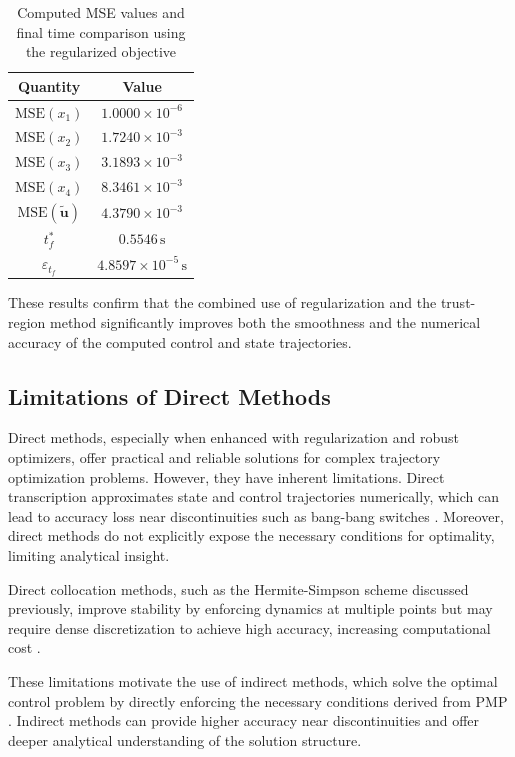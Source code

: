 \begin{table}[H]
\centering
\begin{tabular}{|c|c|}
\hline
\textbf{Quantity} & \textbf{Value} \\
\hline
\( \text{MSE}(x_1) \) & \( 1.0000 \times 10^{-6} \) \\
\( \text{MSE}(x_2) \) & \( 1.7240 \times 10^{-3} \) \\
\( \text{MSE}(x_3) \) & \( 3.1893 \times 10^{-3} \) \\
\( \text{MSE}(x_4) \) & \( 8.3461 \times 10^{-3} \) \\
\( \text{MSE}(\mathbf{\tilde{u}}) \) & \( 4.3790 \times 10^{-3} \) \\
\hline
\( t_f^{*} \) & \( 0.5546 \, \text{s} \) \\
\( \varepsilon_{t_f} \) & \( 4.8597 \times 10^{-5} \, \text{s} \) \\
\hline
\end{tabular}
\caption{Computed MSE values and final time comparison using the regularized objective}
\end{table}


These results confirm that the combined use of regularization and the trust-region method significantly improves both the smoothness and the numerical accuracy of the computed control and state trajectories.


\subsection{Limitations of Direct Methods}

Direct methods, especially when enhanced with regularization and robust optimizers, offer practical and reliable solutions for complex trajectory optimization problems. However, they have inherent limitations. Direct transcription approximates state and control trajectories numerically, which can lead to accuracy loss near discontinuities such as bang-bang switches \cite{sanchez2018real}. Moreover, direct methods do not explicitly expose the necessary conditions for optimality, limiting analytical insight.

Direct collocation methods, such as the Hermite-Simpson scheme discussed previously, improve stability by enforcing dynamics at multiple points but may require dense discretization to achieve high accuracy, increasing computational cost \cite{rao2010survey}.

These limitations motivate the use of indirect methods, which solve the optimal control problem by directly enforcing the necessary conditions derived from PMP \cite{bryson2018applied}. Indirect methods can provide higher accuracy near discontinuities and offer deeper analytical understanding of the solution structure.

